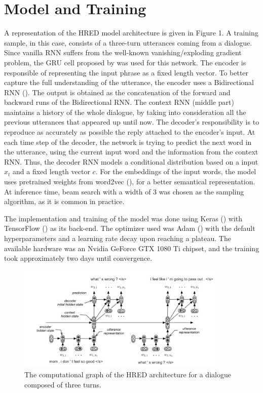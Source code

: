\documentclass{article}
\begin{document}
\section{Model and Training}

A representation of the HRED model architecture is given in Figure 1. A training sample, in this case, consists of a three-turn utterances coming from a dialogue. Since vanilla RNN suffers from the well-known vanishing/exploding gradient problem, the GRU cell proposed by \citet{DBLP:journals/corr/ChoMGBSB14} was used for this network. The encoder is responsible of representing the input phrase as a fixed length vector. To better capture the full understanding of the utterance, the encoder uses a Bidirectional RNN (\citet{650093}). The output is obtained as the concatenation of the forward and backward runs of the Bidirectional RNN. The context RNN (middle part) maintains a history of the whole dialogue, by taking into consideration all the previous utterances that appeared up until now. The decoder's responsibility is to reproduce as accurately as possible the reply attached to the encoder's input. At each time step of the decoder, the network is trying to predict the next word in the utterance, using the current input word and the information from the context RNN. Thus, the decoder RNN models a conditional distribution based on a input \(x_t\) and a fixed length vector \(c\). For the embeddings of the input words, the model uses pretrained weights from word2vec (\citet{DBLP:journals/corr/abs-1301-3781}), for a better semantical representation.  At inference time, beam search with a width of 3 was chosen as the sampling algorithm, as it is common in practice.

The implementation and training of the model was done using Keras (\citet{chollet2015keras}) with TensorFlow (\citet{tensorflow2015-whitepaper}) as its back-end. The optimizer used was Adam (\cite{DBLP:journals/corr/KingmaB14}) with the default hyperparameters and a learning rate decay upon reaching a plateau. The available hardware was an Nvidia GeForce GTX 1080 Ti chipset, and the training took approximately two days until convergence.

\begin{figure}
    \centering
        \includegraphics[width=0.9\textwidth]{images/hred.png}
        \caption{The computational graph of the HRED architecture for a dialogue composed of three turns.}
    \end{figure}
\end{document}
